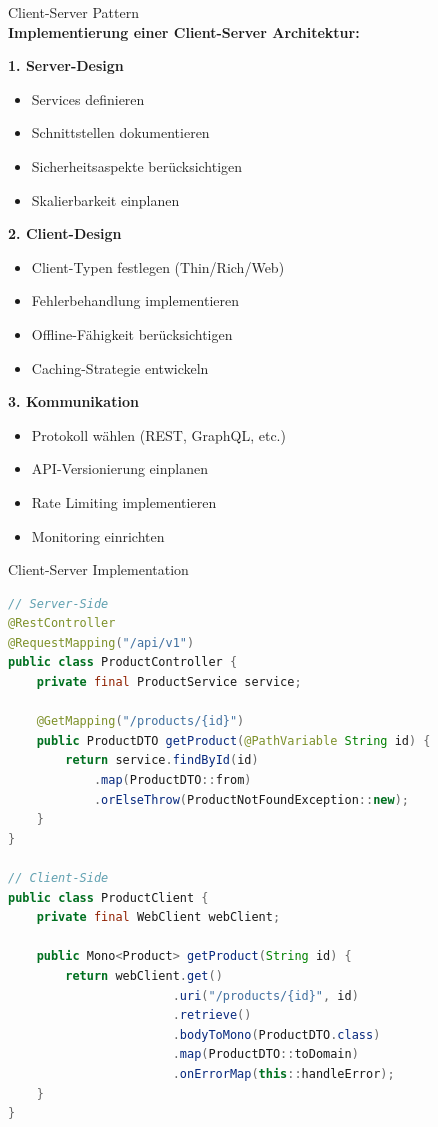 \begin{KR}{Client-Server Pattern}\\
\textbf{Implementierung einer Client-Server Architektur:}

\textbf{1. Server-Design}
\begin{itemize}
    \item Services definieren
    \item Schnittstellen dokumentieren
    \item Sicherheitsaspekte berücksichtigen
    \item Skalierbarkeit einplanen
\end{itemize}

\textbf{2. Client-Design}
\begin{itemize}
    \item Client-Typen festlegen (Thin/Rich/Web)
    \item Fehlerbehandlung implementieren
    \item Offline-Fähigkeit berücksichtigen
    \item Caching-Strategie entwickeln
\end{itemize}

\textbf{3. Kommunikation}
\begin{itemize}
    \item Protokoll wählen (REST, GraphQL, etc.)
    \item API-Versionierung einplanen
    \item Rate Limiting implementieren
    \item Monitoring einrichten
\end{itemize}
\end{KR}

\begin{example2}{Client-Server Implementation}
\begin{lstlisting}[language=Java, style=basesmol]
// Server-Side
@RestController
@RequestMapping("/api/v1")
public class ProductController {
    private final ProductService service;
    
    @GetMapping("/products/{id}")
    public ProductDTO getProduct(@PathVariable String id) {
        return service.findById(id)
            .map(ProductDTO::from)
            .orElseThrow(ProductNotFoundException::new);
    }
}

// Client-Side
public class ProductClient {
    private final WebClient webClient;
    
    public Mono<Product> getProduct(String id) {
        return webClient.get()
                       .uri("/products/{id}", id)
                       .retrieve()
                       .bodyToMono(ProductDTO.class)
                       .map(ProductDTO::toDomain)
                       .onErrorMap(this::handleError);
    }
}
\end{lstlisting}
\end{example2}

